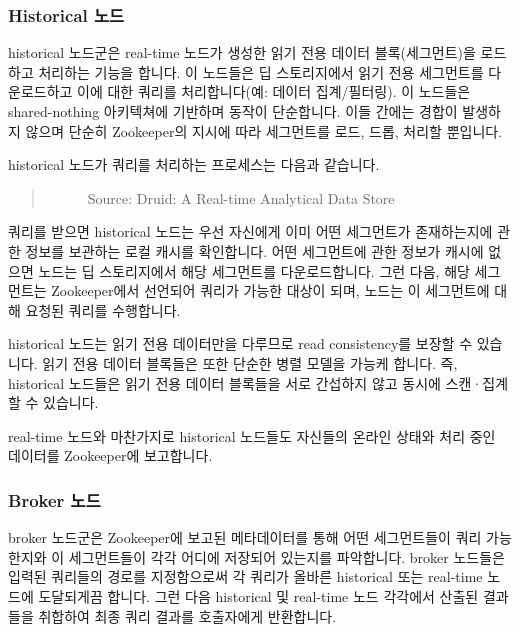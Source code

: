 \documentclass[letterpaper,10pt,english]{sphinxmanual}
\begin{document}
\subsubsection{Historical 노드}
\label{\detokenize{discovery/part01/druid_nodes:historical}}\label{\detokenize{discovery/part01/druid_nodes:historical-nodes}}
historical 노드군은 real-time 노드가 생성한 읽기 전용 데이터 블록(세그먼트)을 로드하고 처리하는 기능을 합니다. 이 노드들은 딥 스토리지에서 읽기 전용 세그먼트를 다운로드하고 이에 대한 쿼리를 처리합니다(예: 데이터 집계/필터링). 이 노드들은 shared-nothing 아키텍쳐에 기반하며 동작이 단순합니다. 이들 간에는 경합이 발생하지 않으며 단순히 Zookeeper의 지시에 따라 세그먼트를 로드, 드롭, 처리할 뿐입니다.

historical 노드가 쿼리를 처리하는 프로세스는 다음과 같습니다.
\begin{quote}

\begin{figure}[H]
\centering
\capstart

\noindent{}
\caption{Source: Druid: A Real-time Analytical Data Store}\label{\detokenize{discovery/part01/druid_nodes:id6}}\end{figure}
\end{quote}

쿼리를 받으면 historical 노드는 우선 자신에게 이미 어떤 세그먼트가 존재하는지에 관한 정보를 보관하는 로컬 캐시를 확인합니다. 어떤 세그먼트에 관한 정보가 캐시에 없으면 노드는 딥 스토리지에서 해당 세그먼트를 다운로드합니다. 그런 다음, 해당 세그먼트는 Zookeeper에서 선언되어 쿼리가 가능한 대상이 되며, 노드는 이 세그먼트에 대해 요청된 쿼리를 수행합니다.

historical 노드는 읽기 전용 데이터만을 다루므로 read consistency를 보장할 수 있습니다. 읽기 전용 데이터 블록들은 또한 단순한 병렬 모델을 가능케 합니다. 즉, historical 노드들은 읽기 전용 데이터 블록들을 서로 간섭하지 않고 동시에 스캔·집계할 수 있습니다.

real-time 노드와 마찬가지로 historical 노드들도 자신들의 온라인 상태와 처리 중인 데이터를 Zookeeper에 보고합니다.


\subsubsection{Broker 노드}
\label{\detokenize{discovery/part01/druid_nodes:broker}}\label{\detokenize{discovery/part01/druid_nodes:broker-nodes}}
broker 노드군은 Zookeeper에 보고된 메타데이터를 통해 어떤 세그먼트들이 쿼리 가능한지와 이 세그먼트들이 각각 어디에 저장되어 있는지를 파악합니다. broker 노드들은 입력된 쿼리들의 경로를 지정함으로써 각 쿼리가 올바른 historical 또는 real-time 노드에 도달되게끔 합니다. 그런 다음 historical 및 real-time 노드 각각에서 산출된 결과들을 취합하여 최종 쿼리 결과를 호출자에게 반환합니다.
\end{document}
